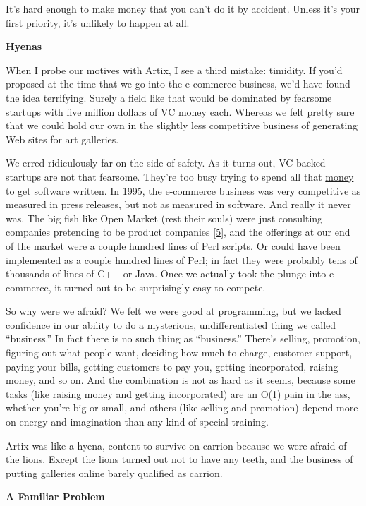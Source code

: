 It's hard enough to make money that you can't do it by accident. Unless
it's your first priority, it's unlikely to happen at all.

\textbf{Hyenas}

When I probe our motives with Artix, I see a third mistake: timidity. If
you'd proposed at the time that we go into the e-commerce business, we'd
have found the idea terrifying. Surely a field like that would be
dominated by fearsome startups with five million dollars of VC money
each. Whereas we felt pretty sure that we could hold our own in the
slightly less competitive business of generating Web sites for art
galleries.

We erred ridiculously far on the side of safety. As it turns out,
VC-backed startups are not that fearsome. They're too busy trying to
spend all that \href{venturecapital.html}{money} to get software
written. In 1995, the e-commerce business was very competitive as
measured in press releases, but not as measured in software. And really
it never was. The big fish like Open Market (rest their souls) were just
consulting companies pretending to be product companies
{[}\hyperref[f5n]{5}{]}, and the offerings at our end of the market were
a couple hundred lines of Perl scripts. Or could have been implemented
as a couple hundred lines of Perl; in fact they were probably tens of
thousands of lines of C++ or Java. Once we actually took the plunge into
e-commerce, it turned out to be surprisingly easy to compete.

So why were we afraid? We felt we were good at programming, but we
lacked confidence in our ability to do a mysterious, undifferentiated
thing we called ``business.'' In fact there is no such thing as
``business.'' There's selling, promotion, figuring out what people want,
deciding how much to charge, customer support, paying your bills,
getting customers to pay you, getting incorporated, raising money, and
so on. And the combination is not as hard as it seems, because some
tasks (like raising money and getting incorporated) are an O(1) pain in
the ass, whether you're big or small, and others (like selling and
promotion) depend more on energy and imagination than any kind of
special training.

Artix was like a hyena, content to survive on carrion because we were
afraid of the lions. Except the lions turned out not to have any teeth,
and the business of putting galleries online barely qualified as
carrion.

\textbf{A Familiar Problem}

